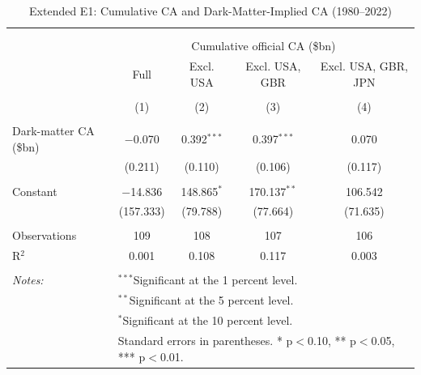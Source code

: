 \documentclass[11pt]{article}
\begin{document}
\small
\setcounter{table}{1}

\renewcommand{\thetable}{E1}
\begin{table}[!htbp] \centering 
  \caption{Extended E1: Cumulative CA and Dark-Matter-Implied CA (1980--2022)} 
  \label{tab:E1_ext} 
\begin{tabular}{@{\extracolsep{5pt}}lcccc} 
\\[-1.8ex]\hline 
\hline \\[-1.8ex] 
\\[-1.8ex] & \multicolumn{4}{c}{Cumulative official CA (\$bn)} \\ 
 & Full & Excl. USA & Excl. USA, GBR & Excl. USA, GBR, JPN \\ 
\\[-1.8ex] & (1) & (2) & (3) & (4)\\ 
\hline \\[-1.8ex] 
 Dark-matter CA (\$bn) & $-$0.070 & 0.392$^{***}$ & 0.397$^{***}$ & 0.070 \\ 
  & (0.211) & (0.110) & (0.106) & (0.117) \\ 
  & & & & \\ 
 Constant & $-$14.836 & 148.865$^{*}$ & 170.137$^{**}$ & 106.542 \\ 
  & (157.333) & (79.788) & (77.664) & (71.635) \\ 
  & & & & \\ 
Observations & 109 & 108 & 107 & 106 \\ 
R$^{2}$ & 0.001 & 0.108 & 0.117 & 0.003 \\ 
\hline \\[-1.8ex] 
\textit{Notes:} & \multicolumn{4}{l}{$^{***}$Significant at the 1 percent level.} \\ 
 & \multicolumn{4}{l}{$^{**}$Significant at the 5 percent level.} \\ 
 & \multicolumn{4}{l}{$^{*}$Significant at the 10 percent level.} \\ 
 & \multicolumn{4}{l}{Standard errors in parentheses. * p$<$0.10, ** p$<$0.05, *** p$<$0.01.} \\ 
\end{tabular} 
\end{table} 
\end{document}
